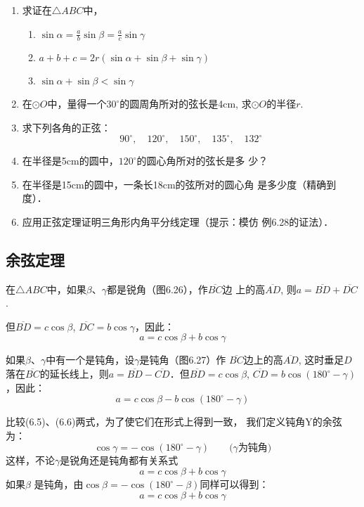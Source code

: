 \begin{ex}
\begin{enumerate}
    \item 求证在$\triangle ABC$中，
\begin{enumerate}
    \item $\sin\alpha=\frac{a}{b}\sin\beta=\frac{a}{c}\sin\gamma$
    \item $a+b+c=2r(\sin\alpha +\sin\beta+\sin\gamma)$
    \item $\sin\alpha+\sin\beta<\sin\gamma$
\end{enumerate}

\item 在$\odot O$中，量得一个$30^{\circ}$的圆周角所对的弦长是4cm,
求$\odot O$的半径$r$.
\item 求下列各角的正弦：
\[90^{\circ},\quad 120^{\circ},\quad 150^{\circ},\quad 135^{\circ},\quad 132^{\circ}\]
\item 在半径是5cm的圆中，$120^{\circ}$的圆心角所对的弦长是多
少？
\item 在半径是15cm的圆中，一条长18cm的弦所对的圆心角
是多少度（精确到度）．
\item 应用正弦定理证明三角形内角平分线定理（提示：模仿
例6.28的证法）．
\end{enumerate}
\end{ex}

\subsection{余弦定理}
在$\triangle ABC$中，如果$\beta$、$\gamma$都是锐角（图6.26），作$\overline{BC}$边
上的高$\overline{AD}$, 则$a=\overline{BD}+\overline{DC}$.

但$\overline{BD}=c\cos\beta$, $\overline{DC}=b\cos\gamma$，因此：
\begin{equation}
    a=c\cos\beta+b\cos\gamma
\end{equation}

如果$\beta$、$\gamma$中有一个是钝角，设$\gamma$是钝角（图6.27）作
$\overline{BC}$边上的高$\overline{AD}$, 这时垂足$D$落在$\overline{BC}$的延长线上，则$a=\overline{BD}-\overline{CD}$．但$\overline{BD}=c\cos\beta$, $\overline{CD}=b\cos(180^{\circ}-\gamma)$，因此：
\begin{equation}
    a=c\cos\beta -b\cos(180^{\circ}-\gamma)
\end{equation}

比较(6.5)、(6.6)两式，为了使它们在形式上得到一致，
我们定义钝角Y的余弦为：
\[\cos\gamma=-\cos(180^{\circ}-\gamma)\qquad \text{($\gamma$为钝角)}\]
这样，不论$\gamma$是锐角还是钝角都有关系式
\[a=c\cos\beta +b\cos\gamma\]
如果$\beta$ 是钝角，由$\cos\beta =-\cos(180^{\circ}-\beta )$同样可以得到：
\[a=c\cos\beta +b\cos\gamma\]

